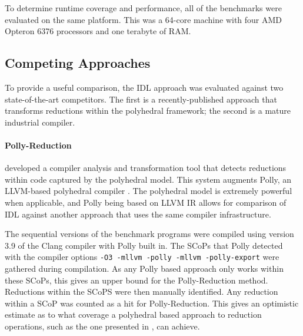     To determine runtime coverage and performance, all of the benchmarks were
    evaluated on the same platform.
    This was a 64-core machine with four AMD Opteron 6376 processors and one
    terabyte of RAM.

\subsection{Competing Approaches}
\label{section:competition}

    To provide a useful comparison, the IDL approach was evaluated against two
    state-of-the-art competitors.
    The first is a recently-published approach that transforms reductions within
    the polyhedral framework; the second is a mature industrial compiler.

\paragraph*{Polly-Reduction}

    \citet{Doerfert2015Polly} developed a compiler analysis and transformation
    tool that detects reductions within code captured by the polyhedral model.
    This system augments Polly, an LLVM-based polyhedral compiler
    \citep{Lengauer2012Polly}.
    The polyhedral model is extremely powerful when applicable, and Polly being
    based on LLVM IR allows for comparison of IDL against another approach that
    uses the same compiler infrastructure.

    The sequential versions of the benchmark programs were compiled using
    version 3.9 of the Clang compiler with Polly built in.
    The SCoPs that Polly detected with the compiler options \texttt{-O3
    -mllvm -polly -mllvm -polly-export} were gathered during compilation.
    As any Polly based approach only works within these SCoPs, this gives an
    upper bound for the Polly-Reduction method.
    Reductions within the SCoPS were then manually identified.
    Any reduction within a SCoP was counted as a hit for Polly-Reduction.
    This gives an optimistic estimate as to what coverage a polyhedral based
    approach to reduction operations, such as the one presented in
    \citet{Doerfert2015Polly}, can achieve.

